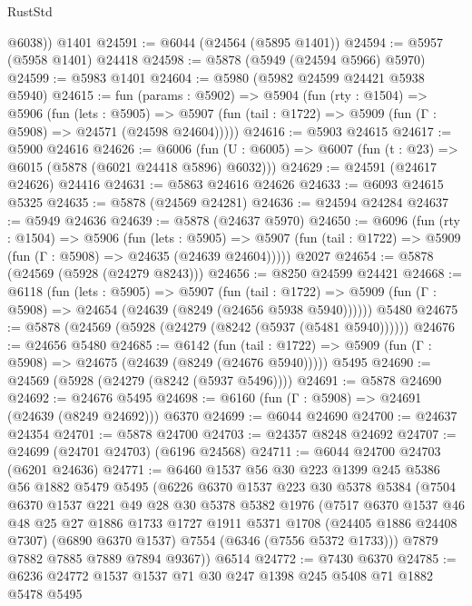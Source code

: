 \begin{lexlean}{RustStd}
\begin{coremodule}
        @6038))
    @1401
@24591 := @6044 (@24564 (@5895 @1401))
@24594 := @5957 (@5958 @1401) @24418
@24598 := @5878 (@5949 (@24594 @5966) @5970)
@24599 := @5983 @1401
@24604 := @5980 (@5982 @24599 @24421 @5938 @5940)
@24615 := fun (params : @5902) =>
  @5904
    (fun (rty : @1504) =>
    @5906
      (fun (lets : @5905) =>
      @5907 (fun (tail : @1722) => @5909 (fun (Γ : @5908) => @24571 (@24598 @24604)))))
@24616 := @5903 @24615
@24617 := @5900 @24616
@24626 := @6006
    (fun (U : @6005) => @6007 (fun (t : @23) => @6015 (@5878 (@6021 @24418 @5896) @6032)))
@24629 := @24591 (@24617 @24626) @24416
@24631 := @5863 @24616 @24626
@24633 := @6093 @24615 @5325
@24635 := @5878 (@24569 @24281)
@24636 := @24594 @24284
@24637 := @5949 @24636
@24639 := @5878 (@24637 @5970)
@24650 := @6096
    (fun (rty : @1504) =>
    @5906
      (fun (lets : @5905) =>
      @5907 (fun (tail : @1722) => @5909 (fun (Γ : @5908) => @24635 (@24639 @24604)))))
    @2027
@24654 := @5878 (@24569 (@5928 (@24279 @8243)))
@24656 := @8250 @24599 @24421
@24668 := @6118
    (fun (lets : @5905) =>
    @5907
      (fun (tail : @1722) =>
      @5909 (fun (Γ : @5908) => @24654 (@24639 (@8249 (@24656 @5938 @5940))))))
    @5480
@24675 := @5878 (@24569 (@5928 (@24279 (@8242 (@5937 (@5481 @5940))))))
@24676 := @24656 @5480
@24685 := @6142
    (fun (tail : @1722) => @5909 (fun (Γ : @5908) => @24675 (@24639 (@8249 (@24676 @5940)))))
    @5495
@24690 := @24569 (@5928 (@24279 (@8242 (@5937 @5496))))
@24691 := @5878 @24690
@24692 := @24676 @5495
@24698 := @6160 (fun (Γ : @5908) => @24691 (@24639 (@8249 @24692))) @6370
@24699 := @6044 @24690
@24700 := @24637 @24354
@24701 := @5878 @24700
@24703 := @24357 @8248 @24692
@24707 := @24699 (@24701 @24703) (@6196 @24568)
@24711 := @6044 @24700 @24703 (@6201 @24636)
@24771 := @6460
    @1537
    @56
    @30
    @223
    @1399
    @245
    @5386
    @56
    @1882
    @5479
    @5495
    (@6226
      @6370
      @1537
      @223
      @30
      @5378
      @5384
      (@7504
        @6370
        @1537
        @221
        @49
        @28
        @30
        @5378
        @5382
        @1976
        (@7517
          @6370
          @1537
          @46
          @48
          @25
          @27
          @1886
          @1733
          @1727
          @1911
          @5371
          @1708
          (@24405 @1886 @24408 @7307)
          (@6890 @6370 @1537)
          @7554
          (@6346 (@7556 @5372 @1733)))
        @7879
        @7882
        @7885
        @7889
        @7894
        @9367))
    @6514
@24772 := @7430 @6370
@24785 := @6236 @24772 @1537 @1537 @71 @30 @247 @1398 @245 @5408 @71 @1882 @5478 @5495

\end{coremodule}
\end{lexlean}
